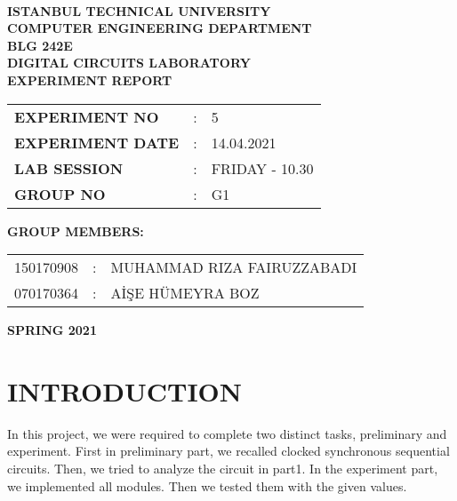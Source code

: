\documentclass[pdftex,12pt,a4paper]{article}
\begin{document}
\begin{titlepage}
\begin{center}
\textbf{}\\
\textbf{\Large{ISTANBUL TECHNICAL UNIVERSITY}}\\
\vspace{0.5cm}
\textbf{\Large{COMPUTER ENGINEERING DEPARTMENT}}\\
\vspace{2cm}
\textbf{\Large{BLG 242E\\ DIGITAL CIRCUITS LABORATORY\\ EXPERIMENT REPORT}}\\
\vspace{2.8cm}
\begin{table}[ht]
\centering
\Large{
\begin{tabular}{lcl}
\textbf{EXPERIMENT NO}  & : & 5 \\
\textbf{EXPERIMENT DATE}  & : & 14.04.2021 \\
\textbf{LAB SESSION}  & : & FRIDAY - 10.30 \\
\textbf{GROUP NO}  & : & G1 \\
\end{tabular}}
\end{table}
\vspace{1cm}
\textbf{\Large{GROUP MEMBERS:}}\\
\begin{table}[ht]
\centering
\Large{
\begin{tabular}{rcl}
150170908  & : & MUHAMMAD RIZA FAIRUZZABADI \\
070170364  & : & AİŞE HÜMEYRA BOZ \\
\end{tabular}}
\end{table}
\vspace{2.8cm}
\textbf{\Large{SPRING 2021}}

\end{center}

\end{titlepage}

\thispagestyle{empty}
\setcounter{tocdepth}{4}
\tableofcontents
\clearpage

\setcounter{page}{1}






\section{INTRODUCTION}
In this project, we were required to complete two distinct tasks, preliminary and experiment. First in preliminary part, we recalled clocked synchronous sequential circuits. Then, we tried to analyze the circuit in part1. In the experiment part, we implemented all modules. Then we tested them with the given values. 
\end{document}
